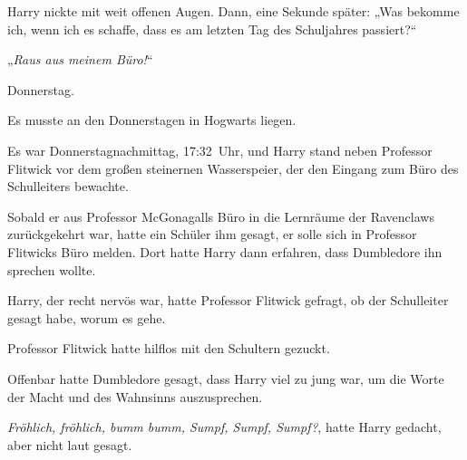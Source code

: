 Harry nickte mit weit offenen Augen. Dann, eine Sekunde später:
„Was bekomme ich, wenn ich es schaffe, dass es am letzten Tag des Schuljahres passiert?“

„\emph{Raus aus meinem Büro!}“

\later

Donnerstag.

Es musste an den Donnerstagen in Hogwarts liegen.

Es war Donnerstagnachmittag, 17:32~Uhr, und Harry stand neben Professor Flitwick vor dem großen steinernen Wasserspeier, der den Eingang zum Büro des Schulleiters bewachte.

Sobald er aus Professor McGonagalls Büro in die Lernräume der Ravenclaws zurückgekehrt war, hatte ein Schüler ihm gesagt, er solle sich in Professor Flitwicks Büro melden. Dort hatte Harry dann erfahren, dass Dumbledore ihn sprechen wollte.

Harry, der recht nervös war, hatte Professor Flitwick gefragt, ob der Schulleiter gesagt habe, worum es gehe.

Professor Flitwick hatte hilflos mit den Schultern gezuckt.

Offenbar hatte Dumbledore gesagt, dass Harry viel zu jung war, um die Worte der Macht und des Wahnsinns auszusprechen.

\emph{Fröhlich, fröhlich, bumm bumm, Sumpf, Sumpf, Sumpf?}, hatte Harry gedacht, aber nicht laut gesagt.


